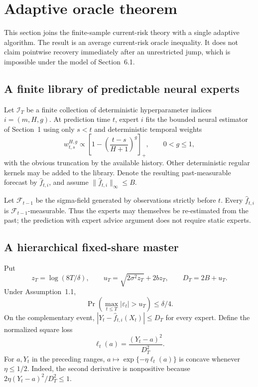 \section{Adaptive oracle theorem}
\label{sec:adaptive-oracle}

This section joins the finite-sample current-risk theory with a single adaptive
algorithm.  The result is an average current-risk oracle inequality.  It does not
claim pointwise recovery immediately after an unrestricted jump, which is
impossible under the model of Section~6.1.

\subsection{A finite library of predictable neural experts}

Let \(\mathcal I_T\) be a finite collection of deterministic hyperparameter
indices \(i=(m,H,g)\).  At prediction time \(t\), expert \(i\) fits the bounded
neural estimator of Section~1 using only \(s<t\) and deterministic temporal
weights
\[
 w^{H,g}_{t,s}
 \propto
 \left[1-\left(\frac{t-s}{H+1}\right)^g\right]_+,
 \qquad 0<g\le 1,
\]
with the obvious truncation by the available history.  Other deterministic
regular kernels may be added to the library.  Denote the resulting
past-measurable forecast by \(\widehat f_{t,i}\), and assume
\(\|\widehat f_{t,i}\|_\infty\le B\).

Let \(\mathcal F_{t-1}\) be the sigma-field generated by observations strictly
before \(t\).  Every \(\widehat f_{t,i}\) is \(\mathcal F_{t-1}\)-measurable.
Thus the experts may themselves be re-estimated from the past; the prediction
with expert advice argument does not require static experts.

\subsection{A hierarchical fixed-share master}

Put
\[
 z_T=\log(8T/\delta),\qquad
 u_T=\sqrt{2\sigma^2 z_T}+2bz_T,\qquad
 D_T=2B+u_T.
\]
Under Assumption~1.1,
\[
 \Pr\!\left(\max_{t\le T}|\varepsilon_t|>u_T\right)\le \delta/4.
\]
On the complementary event, \(|Y_t-\widehat f_{t,i}(X_t)|\le D_T\) for every
expert.  Define the normalized square loss
\[
 \ell_t(a)=\frac{(Y_t-a)^2}{D_T^2}.
\]
For \(a,Y_t\) in the preceding ranges, \(a\mapsto
\exp\{-\eta\ell_t(a)\}\) is concave whenever \(\eta\le 1/2\).  Indeed,
the second derivative is nonpositive because
\(2\eta(Y_t-a)^2/D_T^2\le 1\).

